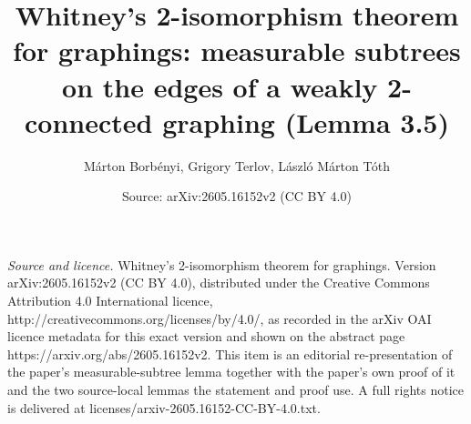 \documentclass[10pt,a4paper]{amsart}
\title[Whitney 2-isomorphism theorem for graphings]{Whitney's 2-isomorphism theorem for graphings: measurable subtrees on the edges of a weakly 2-connected graphing (Lemma 3.5)}
\author[M. Borbényi, G. Terlov, L. M. Tóth]{Márton Borbényi, Grigory Terlov, László Márton Tóth}
\date{Source: arXiv:2605.16152v2 (CC BY 4.0)}
\theoremstyle{plain}
\theoremstyle{definition}
\begin{document}
\maketitle
\vspace{1em}
\noindent\textit{Source and licence.} Whitney's 2-isomorphism theorem for graphings. Version arXiv:2605.16152v2 (CC BY 4.0), distributed under the Creative Commons Attribution 4.0 International licence, http://creativecommons.org/licenses/by/4.0/, as recorded in the arXiv OAI licence metadata for this exact version and shown on the abstract page https://arxiv.org/abs/2605.16152v2. This item is an editorial re-presentation of the paper's measurable-subtree lemma together with the paper's own proof of it and the two source-local lemmas the statement and proof use. A full rights notice is delivered at licenses/arxiv-2605.16152-CC-BY-4.0.txt.
\end{document}
